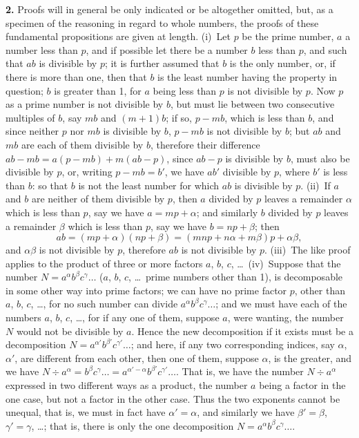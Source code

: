 \documentclass[11pt,a4paper]{article}
\theoremstyle{definition}
\begin{document}
\textbf{2.} Proofs will in general be only indicated or be altogether omitted, but, as a specimen of the reasoning in regard to whole numbers, the proofs of these fundamental propositions are given at length. (i)~Let $p$ be the prime number, $a$ a number less than $p$, and if possible let there be a number $b$ less than $p$, and such that $ab$ is divisible by $p$; it is further assumed that $b$ is the only number, or, if there is more than one, then that $b$ is the least number having the property in question; $b$ is greater than 1, for $a$ being less than $p$ is not divisible by $p$. Now $p$ as a prime number is not divisible by $b$, but must lie between two consecutive multiples of $b$, say $mb$ and $(m+1)b$; if so, $p-mb$, which is less than $b$, and since neither $p$ nor $mb$ is divisible by $b$, $p-mb$ is not divisible by $b$; but $ab$ and $mb$ are each of them divisible by $b$, therefore their difference $ab-mb=a(p-mb)+m(ab-p)$, since $ab-p$ is divisible by $b$, must also be divisible by $p$, or, writing $p-mb=b'$, we have $ab'$ divisible by $p$, where $b'$ is less than $b$: so that $b$ is not the least number for which $ab$ is divisible by $p$. (ii)~If $a$ and $b$ are neither of them divisible by $p$, then $a$ divided by $p$ leaves a remainder $\alpha$ which is less than $p$, say we have $a=mp+\alpha$; and similarly $b$ divided by $p$ leaves a remainder $\beta$ which is less than $p$, say we have $b=np+\beta$; then
\[
ab=(mp+\alpha)(np+\beta)=(mnp+n\alpha+m\beta)p+\alpha\beta,
\]
and $\alpha\beta$ is not divisible by $p$, therefore $ab$ is not divisible by $p$. (iii)~The like proof applies to the product of three or more factors $a$, $b$, $c$, \ldots\ (iv)~Suppose that the number $N=a^\alpha b^\beta c^\gamma\ldots$ ($a$, $b$, $c$, \ldots\ prime numbers other than 1), is decomposable in some other way into prime factors; we can have no prime factor $p$, other than $a$, $b$, $c$, \ldots, for no such number can divide $a^\alpha b^\beta c^\gamma\ldots$; and we must have each of the numbers $a$, $b$, $c$, \ldots, for if any one of them, suppose $a$, were wanting, the number $N$ would not be divisible by $a$. Hence the new decomposition if it exists must be a decomposition $N=a^{\alpha'}b^{\beta'}c^{\gamma'}\ldots$; and here, if any two corresponding indices, say $\alpha$, $\alpha'$, are different from each other, then one of them, suppose $\alpha$, is the greater, and we have $N\div a^\alpha=b^\beta c^\gamma\ldots=a^{\alpha'-\alpha}b^{\beta'}c^{\gamma'}\ldots$. That is, we have the number $N\div a^\alpha$ expressed in two different ways as a product, the number $a$ being a factor in the one case, but not a factor in the other case. Thus the two exponents cannot be unequal, that is, we must in fact have $\alpha'=\alpha$, and similarly we have $\beta'=\beta$, $\gamma'=\gamma$, \ldots; that is, there is only the one decomposition $N=a^\alpha b^\beta c^\gamma\ldots$.
\end{document}
